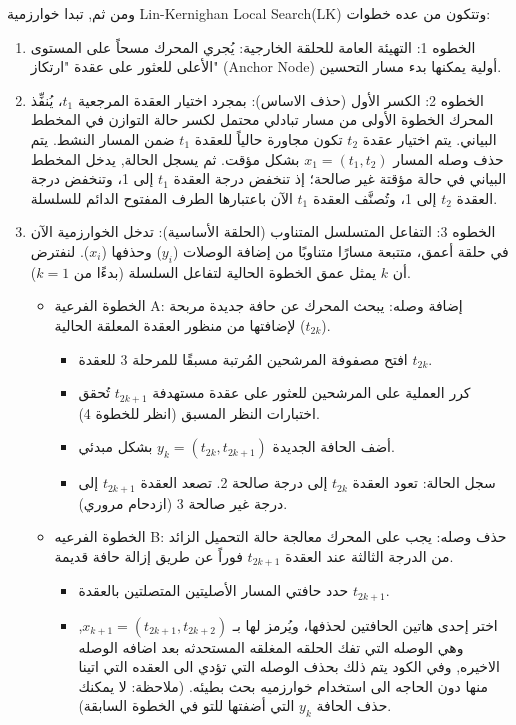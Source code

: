 \documentclass{article}
\newcommand{\en}[1]{\textenglish{#1}}
\begin{document}
ومن ثم, تبدا خوارزمية \en{Lin-Kernighan Local Search(LK)} وتتكون من عده خطوات:

\begin{enumerate}
\item الخطوه 1: التهيئة العامة للحلقة الخارجية:
يُجري المحرك مسحاً على المستوى الأعلى للعثور على عقدة "ارتكاز" (\en{Anchor Node}) أولية يمكنها بدء مسار التحسين.
\item الخطوه 2: الكسر الأول (حذف الاساس):
بمجرد اختيار العقدة المرجعية $t_1$، يُنفِّذ المحرك الخطوة الأولى من مسار تبادلي محتمل لكسر حالة التوازن في المخطط البياني. يتم اختيار عقدة $t_2$ تكون مجاورة حالياً للعقدة $t_1$ ضمن المسار النشط. يتم حذف وصله المسار $x_1 = (t_1, t_2)$ بشكل مؤقت. ثم يسجل الحالة, يدخل المخطط البياني في حالة مؤقتة غير صالحة؛ إذ تنخفض درجة العقدة $t_1$ إلى 1، وتنخفض درجة العقدة $t_2$ إلى 1، وتُصنَّف العقدة $t_1$ الآن باعتبارها الطرف المفتوح الدائم للسلسلة.
\item الخطوه 3: التفاعل المتسلسل المتناوب (الحلقة الأساسية):
تدخل الخوارزمية الآن في حلقة أعمق، متتبعة مسارًا متناوبًا من إضافة الوصلات ($y_i$) وحذفها ($x_i$). لنفترض أن $k$ يمثل عمق الخطوة الحالية لتفاعل السلسلة (بدءًا من $k=1$).\\

	\begin{itemize}
		\item الخطوة الفرعية \en{A}:
	إضافة وصله: يبحث المحرك عن حافة جديدة مربحة لإضافتها من منظور العقدة المعلقة الحالية ($t_{2k}$).
			\begin{itemize}
				\item افتح مصفوفة المرشحين المُرتبة مسبقًا للمرحلة 3 للعقدة $t_{2k}$.
				\item كرر العملية على المرشحين للعثور على عقدة مستهدفة $t_{2k+1}$ تُحقق اختبارات النظر المسبق (انظر للخطوة 4).
				\item أضف الحافة الجديدة $y_k = (t_{2k}, t_{2k+1})$ بشكل مبدئي.
				\item سجل الحالة: تعود العقدة $t_{2k}$ إلى درجة صالحة 2. تصعد العقدة $t_{2k+1}$ إلى درجة غير صالحة 3 (ازدحام مروري).
			\end{itemize}
		\item الخطوة الفرعيه \en{B}: حذف وصله:
	يجب على المحرك معالجة حالة التحميل الزائد من الدرجة الثالثة عند العقدة $t_{2k+1}$ فوراً عن طريق إزالة حافة قديمة.
			\begin{itemize}
				\item حدد حافتي المسار الأصليتين المتصلتين بالعقدة $t_{2k+1}$.
				\item
اختر إحدى هاتين الحافتين لحذفها، ويُرمز لها بـ $x_{k+1} = (t_{2k+1}, t_{2k+2})$, وهي الوصله التي تفك الحلقه المغلقه المستحدثه بعد اضافه الوصله الاخيره, وفي الكود يتم ذلك بحذف الوصله التي تؤدي الى العقده التي اتينا منها دون الحاجه الى استخدام خوارزميه بحث بطيئه. (ملاحظة: لا يمكنك حذف الحافة $y_k$ التي أضفتها للتو في الخطوة السابقة).


\end{itemize}
\end{itemize}
\end{enumerate}
\end{document}
